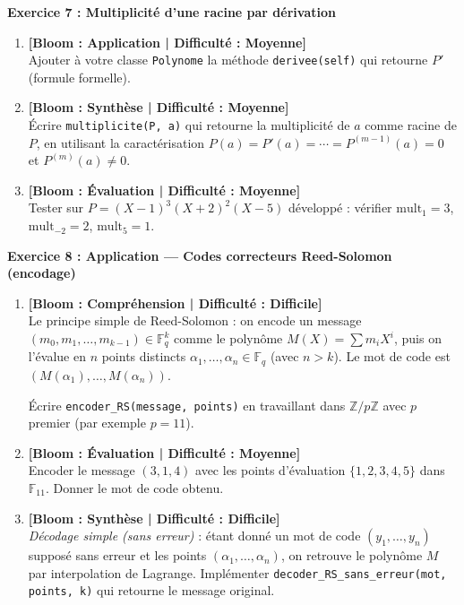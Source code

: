 \noindent\textbf{Exercice 7 : Multiplicité d'une racine par dérivation}
\begin{enumerate}
    \item \textbf{[Bloom : Application | Difficulté : Moyenne]} \\
    Ajouter à votre classe \texttt{Polynome} la méthode \texttt{derivee(self)} qui retourne $P'$ (formule formelle).
    \item \textbf{[Bloom : Synthèse | Difficulté : Moyenne]} \\
    Écrire \texttt{multiplicite(P, a)} qui retourne la multiplicité de $a$ comme racine de $P$, en utilisant la caractérisation $P(a) = P'(a) = \cdots = P^{(m-1)}(a) = 0$ et $P^{(m)}(a) \neq 0$.
    \item \textbf{[Bloom : Évaluation | Difficulté : Moyenne]} \\
    Tester sur $P = (X - 1)^3 (X + 2)^2 (X - 5)$ développé : vérifier $\mathrm{mult}_1 = 3$, $\mathrm{mult}_{-2} = 2$, $\mathrm{mult}_5 = 1$.
\end{enumerate}

\vspace{0.3cm}

\noindent\textbf{Exercice 8 : Application --- Codes correcteurs Reed-Solomon (encodage)}
\begin{enumerate}
    \item \textbf{[Bloom : Compréhension | Difficulté : Difficile]} \\
    Le principe simple de Reed-Solomon : on encode un message $(m_0, m_1, \dots, m_{k-1}) \in \mathbb{F}_q^k$ comme le polynôme $M(X) = \sum m_i X^i$, puis on l'évalue en $n$ points distincts $\alpha_1, \dots, \alpha_n \in \mathbb{F}_q$ (avec $n > k$). Le mot de code est $(M(\alpha_1), \dots, M(\alpha_n))$.

    Écrire \texttt{encoder\_RS(message, points)} en travaillant dans $\mathbb{Z}/p\mathbb{Z}$ avec $p$ premier (par exemple $p = 11$).
    \item \textbf{[Bloom : Évaluation | Difficulté : Moyenne]} \\
    Encoder le message $(3, 1, 4)$ avec les points d'évaluation $\{1, 2, 3, 4, 5\}$ dans $\mathbb{F}_{11}$. Donner le mot de code obtenu.
    \item \textbf{[Bloom : Synthèse | Difficulté : Difficile]} \\
    \emph{Décodage simple (sans erreur)} : étant donné un mot de code $(y_1, \dots, y_n)$ supposé sans erreur et les points $(\alpha_1, \dots, \alpha_n)$, on retrouve le polynôme $M$ par interpolation de Lagrange. Implémenter \texttt{decoder\_RS\_sans\_erreur(mot, points, k)} qui retourne le message original.
\end{enumerate}
